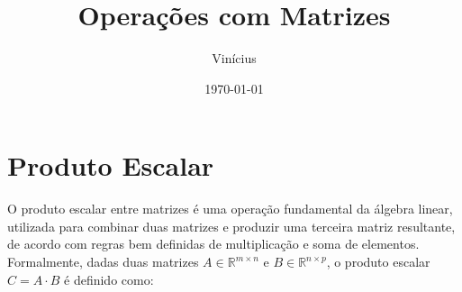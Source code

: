 
\usepackage[utf8]{inputenc}
\usepackage[T1]{fontenc}
\usepackage{lmodern}
\usepackage{geometry}
\geometry{margin=1in}
\usepackage{graphicx}
\usepackage{caption}
\usepackage{subcaption}
\usepackage{amsmath, amsfonts, amssymb}
\usepackage{float}
\usepackage{xcolor}
\usepackage{listings}
\usepackage{enumitem}
\usepackage{hyperref}
\usepackage{fancyhdr}
\usepackage{booktabs}
\usepackage[backend=biber,style=numeric]{biblatex}
\usepackage{algorithm}
\usepackage{algorithmic}


\pagestyle{fancy}
\fancyhf{}
\rfoot{\thepage}


\newcommand{\important}[1]{\textcolor{red}{\textbf{#1}}}
\newcommand{\code}[1]{\texttt{#1}}


\title{Operações com Matrizes}
\author{Vinícius}
\date{\today}



\maketitle
\tableofcontents
\newpage


\section{Produto Escalar}

O produto escalar entre matrizes é uma operação fundamental da álgebra linear, utilizada para combinar duas matrizes e produzir uma terceira matriz resultante, de acordo com regras bem definidas de multiplicação e soma de elementos. Formalmente, dadas duas matrizes \( A \in \mathbb{R}^{m \times n} \) e \( B \in \mathbb{R}^{n \times p} \), o produto escalar \( C = A \cdot B \) é definido como:

